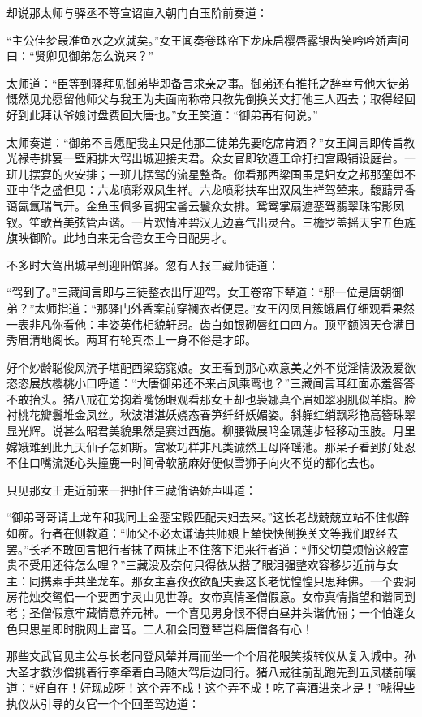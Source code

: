 \documentclass[12pt,UTF8]{ctexbook}
\begin{document}
却说那太师与驿丞不等宣诏直入朝门白玉阶前奏道：

“主公佳梦最准鱼水之欢就矣。”女王闻奏卷珠帘下龙床启樱唇露银齿笑吟吟娇声问曰：“贤卿见御弟怎么说来？”

太师道：“臣等到驿拜见御弟毕即备言求亲之事。御弟还有推托之辞幸亏他大徒弟慨然见允愿留他师父与我王为夫面南称帝只教先倒换关文打他三人西去；取得经回好到此拜认爷娘讨盘费回大唐也。”女王笑道：“御弟再有何说。”

太师奏道：“御弟不言愿配我主只是他那二徒弟先要吃席肯酒？”女王闻言即传旨教光禄寺排宴一壁厢排大驾出城迎接夫君。众女官即钦遵王命打扫宫殿铺设庭台。一班儿摆宴的火安排；一班儿摆驾的流星整备。你看那西梁国虽是妇女之邦那銮舆不亚中华之盛但见：六龙喷彩双凤生祥。六龙喷彩扶车出双凤生祥驾辇来。馥蘛异香蔼氤氲瑞气开。金鱼玉佩多官拥宝髻云鬟众女排。鸳鸯掌扇遮銮驾翡翠珠帘影凤钗。笙歌音美弦管声谐。一片欢情冲碧汉无边喜气出灵台。三檐罗盖摇天宇五色旌旗映御阶。此地自来无合卺女王今日配男才。

不多时大驾出城早到迎阳馆驿。忽有人报三藏师徒道：

“驾到了。”三藏闻言即与三徒整衣出厅迎驾。女王卷帘下辇道：“那一位是唐朝御弟？”太师指道：“那驿门外香案前穿襕衣者便是。”女王闪凤目簇蛾眉仔细观看果然一表非凡你看他：丰姿英伟相貌轩昂。齿白如银砌唇红口四方。顶平额阔天仓满目秀眉清地阁长。两耳有轮真杰士一身不俗是才郎。

好个妙龄聪俊风流子堪配西梁窈窕娘。女王看到那心欢意美之外不觉淫情汲汲爱欲恣恣展放樱桃小口呼道：“大唐御弟还不来占凤乘鸾也？”三藏闻言耳红面赤羞答答不敢抬头。猪八戒在旁掬着嘴饧眼观看那女王却也袅娜真个眉如翠羽肌似羊脂。脸衬桃花瓣鬟堆金凤丝。秋波湛湛妖娆态春笋纤纤妖媚姿。斜軃红绡飘彩艳高簪珠翠显光辉。说甚么昭君美貌果然是赛过西施。柳腰微展鸣金珮莲步轻移动玉肢。月里嫦娥难到此九天仙子怎如斯。宫妆巧样非凡类诚然王母降瑶池。那呆子看到好处忍不住口嘴流涎心头撞鹿一时间骨软筋麻好便似雪狮子向火不觉的都化去也。

只见那女王走近前来一把扯住三藏俏语娇声叫道：

“御弟哥哥请上龙车和我同上金銮宝殿匹配夫妇去来。”这长老战兢兢立站不住似醉如痴。行者在侧教道：“师父不必太谦请共师娘上辇快快倒换关文等我们取经去罢。”长老不敢回言把行者抹了两抹止不住落下泪来行者道：“师父切莫烦恼这般富贵不受用还待怎么哩？”三藏没及奈何只得依从揩了眼泪强整欢容移步近前与女主：同携素手共坐龙车。那女主喜孜孜欲配夫妻这长老忧惶惶只思拜佛。一个要洞房花烛交鸳侣一个要西宇灵山见世尊。女帝真情圣僧假意。女帝真情指望和谐同到老；圣僧假意牢藏情意养元神。一个喜见男身恨不得白昼并头谐伉俪；一个怕逢女色只思量即时脱网上雷音。二人和会同登辇岂料唐僧各有心！

那些文武官见主公与长老同登凤辇并肩而坐一个个眉花眼笑拨转仪从复入城中。孙大圣才教沙僧挑着行李牵着白马随大驾后边同行。猪八戒往前乱跑先到五凤楼前嚷道：“好自在！好现成呀！这个弄不成！这个弄不成！吃了喜酒进亲才是！”唬得些执仪从引导的女官一个个回至驾边道：
\end{document}

